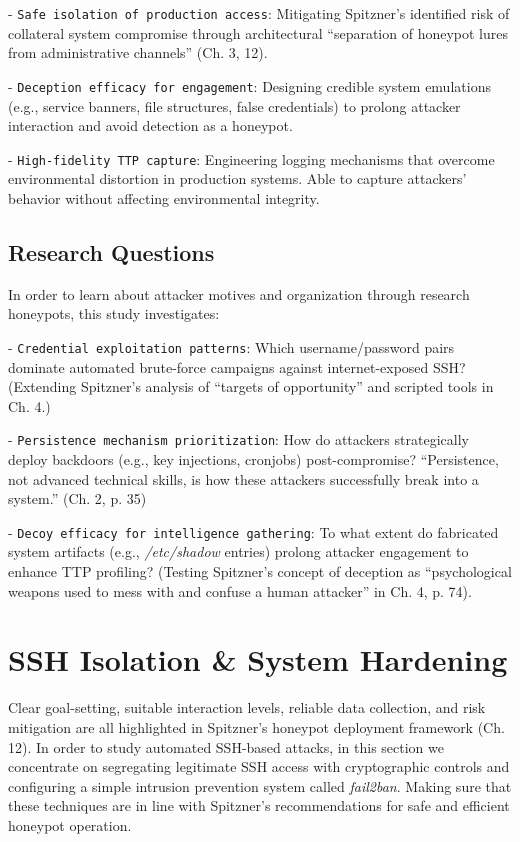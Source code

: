 \documentclass{cls/ULBreport}
\begin{document}
            - \texttt{Safe isolation of production access}: Mitigating Spitzner’s identified risk of collateral system compromise through architectural \enquote{separation of honeypot lures from administrative channels} (Ch. 3, 12).

            - \texttt{Deception efficacy for engagement}: Designing credible system emulations (e.g., service banners, file structures, false credentials) to prolong attacker interaction and avoid detection as a honeypot.

            
            - \texttt{High-fidelity TTP capture}: Engineering logging mechanisms that overcome environmental distortion in production systems. Able to capture attackers' behavior without affecting environmental integrity.

        \subsection{Research Questions}
        In order to learn about attacker motives and organization through research honeypots, this study investigates:

            - \texttt{Credential exploitation patterns}: Which username/password pairs dominate automated brute-force campaigns against internet-exposed SSH? (Extending Spitzner’s analysis of \enquote{targets of opportunity} and scripted tools in Ch. 4.) 

            - \texttt{Persistence mechanism prioritization}: How do attackers strategically deploy backdoors (e.g., key injections, cronjobs) post-compromise? \enquote{Persistence, not advanced technical skills, is how these attackers successfully break into a system.} (Ch. 2, p. 35)

            - \texttt{Decoy efficacy for intelligence gathering}: To what extent do fabricated system artifacts (e.g., \textit{/etc/shadow} entries) prolong attacker engagement to enhance TTP profiling? (Testing Spitzner’s concept of deception as \enquote{psychological weapons used to mess with and confuse a human attacker} in Ch. 4, p. 74).
            


        
    \section{SSH Isolation \& System Hardening}
    Clear goal-setting, suitable interaction levels, reliable data collection, and risk mitigation are all highlighted in Spitzner's honeypot deployment framework (Ch. 12). In order to study automated SSH-based attacks, in this section we concentrate on segregating legitimate SSH access with cryptographic controls and configuring a simple intrusion prevention system called \textit{fail2ban}. Making sure that these techniques are in line with Spitzner's recommendations for safe and efficient honeypot operation.
        
\end{document}
